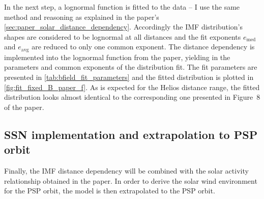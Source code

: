 In the next step, a lognormal function is fitted to the data -- I use the same method and reasoning as explained in the paper's \autoref{sec:paper_solar_distance_dependency}. Accordingly the IMF distribution's shapes are considered to be lognormal at all distances and the fit exponents $e_\text{med}$ and $e_\text{avg}$ are reduced to only one common exponent. The distance dependency is implemented into the lognormal function from the paper, yielding in the parameters and common exponents of the distribution fit. The fit parameters are presented in \autoref{tab:bfield_fit_parameters} and the fitted distribution is plotted in \autoref{fig:fit_fixed_B_paper_f}.
As is expected for the Helios distance range, the fitted distribution looks almost identical to the corresponding one presented in Figure~8 of the paper.
\begin{figure}[htb]
\end{figure}

\clearpage

\subsection{SSN implementation and extrapolation to PSP orbit}
Finally, the IMF distance dependency will be combined with the solar activity relationship obtained in the paper. In order to derive the solar wind environment for the PSP orbit, the model is then extrapolated to the PSP orbit.

